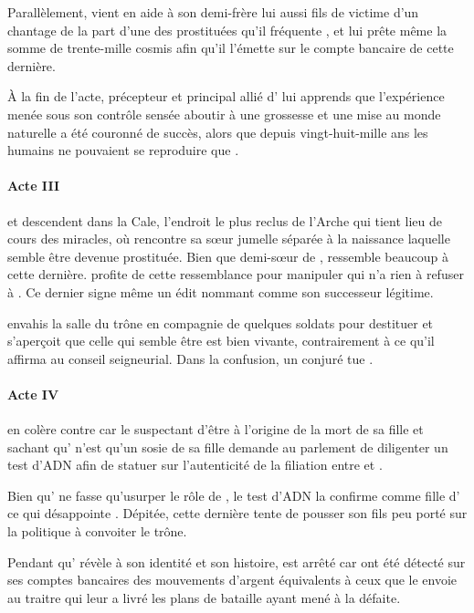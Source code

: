 Parallèlement, \elena{} vient en aide à son demi-frère \vladimir{} lui aussi fils de \reine{} victime d’un chantage de la part d’une des prostituées qu’il fréquente \catin, et lui prête même la somme de trente-mille cosmis afin qu’il l’émette sur le compte bancaire de cette dernière.

À la fin de l’acte, \alexas{} précepteur et principal allié d’\elena{} lui apprends que l’expérience menée sous son contrôle sensée aboutir à une grossesse et une mise au monde naturelle a été couronné de succès, alors que depuis vingt-huit-mille ans les humains ne pouvaient se reproduire que .


\paragraph{Acte III}
\elena{} et \alexas{} descendent dans la Cale, l’endroit le plus reclus de l’Arche qui tient lieu de cours des miracles, où \elena{} rencontre \ela{} sa sœur jumelle séparée à la naissance laquelle semble être devenue prostituée. Bien que demi-sœur de \princesse{}, \ela{} ressemble beaucoup à cette dernière. \elena{} profite de cette ressemblance pour manipuler \roi{} qui n’a rien à refuser à \ela{}. Ce dernier signe même un édit nommant \elena{} comme son successeur légitime.

\general{} envahis la salle du trône en compagnie de quelques soldats pour destituer \roi{} et s’aperçoit que celle qui semble être \princesse{} est bien vivante, contrairement à ce qu’il affirma au conseil seigneurial. Dans la confusion, un conjuré tue \general{}.

\paragraph{Acte IV}
\reine{} en colère contre \elena{} car le suspectant d’être à l’origine de la mort de sa fille et sachant qu’\ela{} n’est qu’un sosie de sa fille \princesse{} demande au parlement de diligenter un test d’ADN afin de statuer sur l’autenticité de la filiation entre \roi{} et \ela{}.

Bien qu’\ela{} ne fasse qu’usurper le rôle de \princesse{}, le test d’ADN la confirme comme fille d’\roi{} ce qui désappointe \reine. Dépitée, cette dernière tente de pousser son fils \vladimir{} peu porté sur la politique à convoiter le trône.

Pendant qu’\elena{} révèle à \ela{} son identité et son histoire, \vladimir{} est arrêté car ont été détecté sur ses comptes bancaires des mouvements d’argent équivalents à ceux que le \campoppose{} envoie au traitre qui leur a livré les plans de bataille ayant mené à la défaite.

